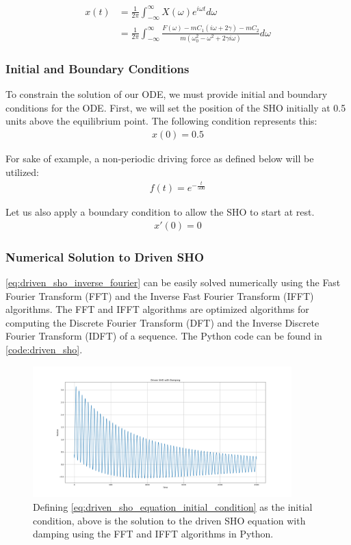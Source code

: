 \begin{align} \label{eq:driven_sho_inverse_fourier}
    x(t) &= \frac{1}{2 \pi} \int_{-\infty}^{\infty} X(\omega) e^{i \omega t} d\omega \\
    &= \frac{1}{2 \pi} \int_{-\infty}^{\infty} \frac{F(\omega) - m C_1 \left( i \omega + 2 \gamma \right) - m C_2}{m \left( \omega_0^2 - \omega^2 + 2 \gamma i \omega \right)} d\omega
\end{align}

\subsubsection{Initial and Boundary Conditions}
\noindent
To constrain the solution of our ODE, we must provide initial and boundary conditions for the ODE. First, we will set the position of the SHO initially at 0.5 units above the equilibrium point. The following condition represents this:
\begin{align}
    x(0)=0.5 \label{eq:driven_sho_equation_initial_condition}
\end{align}

\noindent
For sake of example, a non-periodic driving force as defined below will be utilized:
\begin{align}
    f(t) = e^{-\frac{t}{500}}
\end{align}

\noindent
Let us also apply a boundary condition to allow the SHO to start at rest.
\begin{align}
    x'(0) = 0
\end{align}

\subsubsection{Numerical Solution to Driven SHO}
\cref{eq:driven_sho_inverse_fourier} can be easily solved numerically using the Fast Fourier Transform (FFT) and the Inverse Fast Fourier Transform (IFFT) algorithms. The FFT and IFFT algorithms are optimized algorithms for computing the Discrete Fourier Transform (DFT) and the Inverse Discrete Fourier Transform (IDFT) of a sequence. The Python code can be found in \cref{code:driven_sho}.

\begin{figure}[H]
    \centering
    \includegraphics[width=100mm,height=\textheight,keepaspectratio]{images/driven_sho_equation_numerical.png}
    \caption{Defining \cref{eq:driven_sho_equation_initial_condition} as the initial condition, above is the solution to the driven SHO equation with damping using the FFT and IFFT algorithms in Python.}
    \label{fig:driven_sho_equation_numerical}
\end{figure}